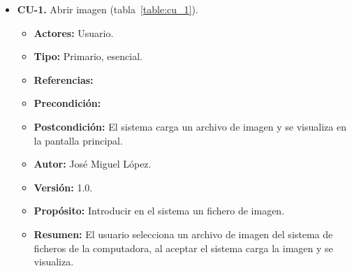 \begin{itemize}
\item \textbf{CU-1.} Abrir imagen (tabla~\ref{table:cu_1}).

\begin{itemize}
	\item \textbf{Actores:} Usuario.
	\item \textbf{Tipo:} Primario, esencial.
	\item \textbf{Referencias:} 
	\item \textbf{Precondición:}
	\item \textbf{Postcondición:} El sistema carga un archivo de imagen y se visualiza en la pantalla principal.
	\item \textbf{Autor:} José Miguel López.
	\item \textbf{Versión:} 1.0.
	\item \textbf{Propósito:} Introducir en el sistema un fichero de imagen.
	\item \textbf{Resumen:} El usuario selecciona un archivo de imagen del sistema de ficheros de la computadora,  al aceptar el sistema carga la imagen y se visualiza. 
\end{itemize}
		   

\end{itemize}
